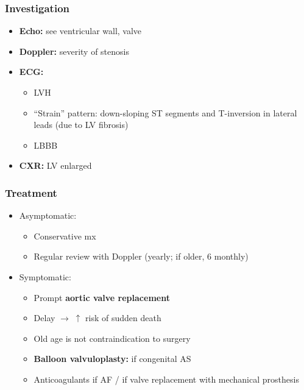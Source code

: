 \documentclass[
  12pt,
]{memoir}
\providecommand{\tightlist}{%
  \setlength{\itemsep}{0pt}\setlength{\parskip}{0pt}}
\begin{document}
\hypertarget{investigation-11}{%
\subsubsection{Investigation}\label{investigation-11}}

\begin{itemize}
\tightlist
\item
  \textbf{Echo:} see ventricular wall, valve
\item
  \textbf{Doppler:} severity of stenosis
\item
  \textbf{ECG:}

  \begin{itemize}
  \tightlist
  \item
    LVH
  \item
    ``Strain'' pattern: down-sloping ST segments and T-inversion in
    lateral leads (due to LV fibrosis)
  \item
    LBBB
  \end{itemize}
\item
  \textbf{CXR:} LV enlarged
\end{itemize}

\hypertarget{treatment-2}{%
\subsubsection{Treatment}\label{treatment-2}}

\begin{itemize}
\tightlist
\item
  Asymptomatic:

  \begin{itemize}
  \tightlist
  \item
    Conservative mx
  \item
    Regular review with Doppler (yearly; if older, 6 monthly)
  \end{itemize}
\item
  Symptomatic:

  \begin{itemize}
  \tightlist
  \item
    Prompt \textbf{aortic valve replacement}
  \item
    Delay \(\rightarrow\;\uparrow\) risk of sudden death
  \item
    Old age is not contraindication to surgery
  \item
    \textbf{Balloon valvuloplasty:} if congenital AS
  \item
    Anticoagulants if AF / if valve replacement with mechanical
    prosthesis
  \end{itemize}
\end{itemize}
\end{document}
